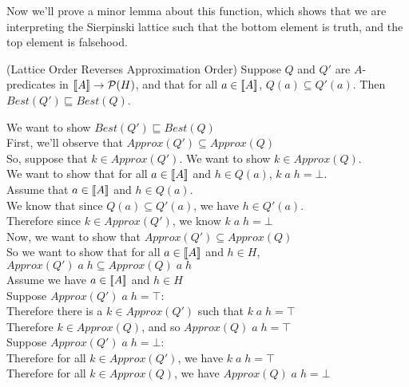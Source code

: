 Now we'll prove a minor lemma about this function, which shows that we
are interpreting the Sierpinski lattice such that the bottom element
is truth, and the top element is falsehood.

\begin{lemma}{(Lattice Order Reverses Approximation Order)}
Suppose $Q$ and $Q'$ are $A$-predicates in $[\![{A}]\!] \to \mathcal{P}(H)$, and that
for all $a \in [\![{A}]\!]$, $Q(a) \subseteq Q'(a)$. Then $\mathit{Best}(Q') \sqsubseteq \mathit{Best}(Q)$. 
\end{lemma}

\begin{tabbedproof}
\oo We want to show $\mathit{Best}(Q') \sqsubseteq \mathit{Best}(Q)$ \\
\oo First, we'll observe that $\mathit{Approx}(Q') \subseteq \mathit{Approx}(Q)$ \\
\oo So, suppose that $k \in \mathit{Approx}(Q')$. We want to show $k \in \mathit{Approx}(Q)$. \\
\ooo We want to show that for all $a \in [\![{A}]\!]$ and $h \in Q(a)$, $k\;a\;h = \bot$.  \\
\ooo Assume that $a \in [\![{A}]\!]$ and $h \in Q(a)$. \\ 
\oooo We know that since $Q(a) \subseteq Q'(a)$, we have $h \in Q'(a)$.  \\
\oooo Therefore since $k \in \mathit{Approx}(Q')$, we know $k\;a\;h = \bot$ \\
\oo Now, we want to show that $\mathit{Approx}(Q') \subseteq \mathit{Approx}(Q)$ \\
\oo So we want to show that for all $a \in [\![{A}]\!]$ and $h \in H$, $\mathit{Approx}(Q')\;a\;h \subseteq \mathit{Approx}(Q)\;a\;h$ \\
\oo Assume we have $a \in [\![{A}]\!]$ and $h \in H$ \\
\ooo Suppose $\mathit{Approx}(Q')\;a\;h = \top$: \\
\oooo Therefore there is a $k\in\mathit{Approx}(Q')$ such that $k\;a\;h = \top$ \\
\oooo Therefore $k \in \mathit{Approx}(Q)$, and so $\mathit{Approx}(Q)\;a\;h = \top$ \\
\ooo Suppose $\mathit{Approx}(Q')\;a\;h = \bot$: \\
\oooo Therefore for all $k \in \mathit{Approx}(Q')$, we have $k\;a\;h = \top$ \\
\oooo Therefore for all $k \in \mathit{Approx}(Q)$, we have $\mathit{Approx}(Q)\;a\;h = \bot$ \\

\end{tabbedproof}

